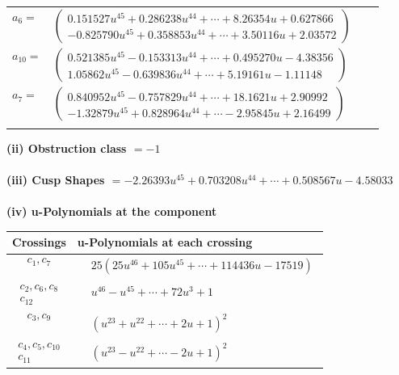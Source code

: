 \documentclass[1p]{elsarticle_modified}
\theoremstyle{definition}
\begin{document}
\begin{tabular}{m{7pt} m{180pt} m{7pt} m{180pt} }
\flushright $a_{6}=$&$\begin{pmatrix}0.151527 u^{45}+0.286238 u^{44}+\cdots+8.26354 u+0.627866\\-0.825790 u^{45}+0.358853 u^{44}+\cdots+3.50116 u+2.03572\end{pmatrix}$ \\
\flushright $a_{10}=$&$\begin{pmatrix}0.521385 u^{45}-0.153313 u^{44}+\cdots+0.495270 u-4.38356\\1.05862 u^{45}-0.639836 u^{44}+\cdots+5.19161 u-1.11148\end{pmatrix}$ \\
\flushright $a_{7}=$&$\begin{pmatrix}0.840952 u^{45}-0.757829 u^{44}+\cdots+18.1621 u+2.90992\\-1.32879 u^{45}+0.828964 u^{44}+\cdots-2.95845 u+2.16499\end{pmatrix}$\\&\end{tabular}
\flushleft \textbf{(ii) Obstruction class $= -1$}\\~\\
\flushleft \textbf{(iii) Cusp Shapes $= -2.26393 u^{45}+0.703208 u^{44}+\cdots+0.508567 u-4.58033$}\\~\\
\newpage\renewcommand{\arraystretch}{1}
\flushleft \textbf{(iv) u-Polynomials at the component}\newline \\
\begin{tabular}{m{50pt}|m{274pt}}
Crossings & \hspace{64pt}u-Polynomials at each crossing \\
\hline $$\begin{aligned}c_{1},c_{7}\end{aligned}$$&$\begin{aligned}
&25(25 u^{46}+105 u^{45}+\cdots+114436 u-17519)
\end{aligned}$\\
\hline $$\begin{aligned}c_{2},c_{6},c_{8}\\c_{12}\end{aligned}$$&$\begin{aligned}
&u^{46}- u^{45}+\cdots+72 u^3+1
\end{aligned}$\\
\hline $$\begin{aligned}c_{3},c_{9}\end{aligned}$$&$\begin{aligned}
&(u^{23}+u^{22}+\cdots+2 u+1)^{2}
\end{aligned}$\\
\hline $$\begin{aligned}c_{4},c_{5},c_{10}\\c_{11}\end{aligned}$$&$\begin{aligned}
&(u^{23}- u^{22}+\cdots-2 u+1)^{2}
\end{aligned}$\\
\hline
\end{tabular}\\~\\
\end{document}
